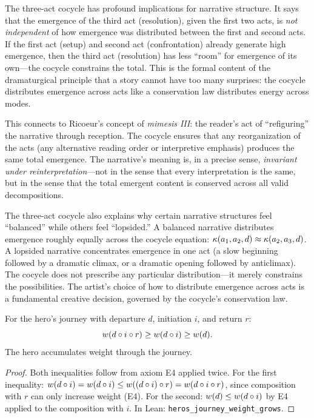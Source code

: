 \begin{interpretation}
\label{interp:three-act-cocycle}
The three-act cocycle has profound implications for narrative structure.  It says that the emergence of the third act (resolution), given the first two acts, is \emph{not independent} of how emergence was distributed between the first and second acts.  If the first act (setup) and second act (confrontation) already generate high emergence, then the third act (resolution) has less ``room'' for emergence of its own---the cocycle constrains the total.  This is the formal content of the dramaturgical principle that a story cannot have too many surprises: the cocycle distributes emergence across acts like a conservation law distributes energy across modes.

This connects to Ricoeur's concept of \emph{mimesis III}: the reader's act of ``refiguring'' the narrative through reception.  The cocycle ensures that any reorganization of the acts (any alternative reading order or interpretive emphasis) produces the same total emergence.  The narrative's meaning is, in a precise sense, \emph{invariant under reinterpretation}---not in the sense that every interpretation is the same, but in the sense that the total emergent content is conserved across all valid decompositions.

The three-act cocycle also explains why certain narrative structures feel ``balanced'' while others feel ``lopsided.''  A balanced narrative distributes emergence roughly equally across the cocycle equation: $\kappa(a_1, a_2, d) \approx \kappa(a_2, a_3, d)$.  A lopsided narrative concentrates emergence in one act (a slow beginning followed by a dramatic climax, or a dramatic opening followed by anticlimax).  The cocycle does not prescribe any particular distribution---it merely constrains the possibilities.  The artist's choice of how to distribute emergence across acts is a fundamental creative decision, governed by the cocycle's conservation law.
\end{interpretation}

\begin{theorem}
\label{thm:heros-journey-weight}
For the hero's journey with departure $d$, initiation $i$, and return $r$:
\[
  w(d \circ i \circ r) \geq w(d \circ i) \geq w(d).
\]
The hero accumulates weight through the journey.
\end{theorem}

\begin{proof}
Both inequalities follow from axiom E4 applied twice.  For the first inequality: $w(d \circ i) = w(d \circ i) \leq w((d \circ i) \circ r) = w(d \circ i \circ r)$, since composition with $r$ can only increase weight (E4).  For the second: $w(d) \leq w(d \circ i)$ by E4 applied to the composition with $i$.  In Lean: \texttt{heros\_journey\_weight\_grows}.
\end{proof}

